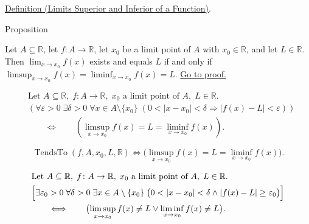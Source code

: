 \begin{dependencies}
\hyperref[def:limsup-liminf-function]{Definition (Limits Superior and Inferior of a Function)}.
\end{dependencies}

\begin{propositionbox}{Proposition}
\begin{proposition}[Limit Exists iff $\limsup=\liminf$]
\label{prop:limsup-liminf-limit-criterion}
Let $A \subseteq \mathbb{R}$, let $f \colon A \to \mathbb{R}$, let $x_0$ be a limit point of $A$ with $x_0 \in \mathbb{R}$, and let $L \in \mathbb{R}$. Then $\lim_{x \to x_0} f(x)$ exists and equals $L$ if and only if $\limsup_{x \to x_0} f(x) = \liminf_{x \to x_0} f(x) = L$.
\hyperref[prf:limsup-liminf-limit-criterion]{Go to proof.}
\end{proposition}
\end{propositionbox}

\begin{remark*}
\[
\begin{aligned}
&\text{Let } A \subseteq \mathbb{R},\; f \colon A \to \mathbb{R},\; x_0 \text{ a limit point of } A,\; L \in \mathbb{R}.\\
&\left(\forall \varepsilon > 0\; \exists \delta > 0\; \forall x \in A \setminus \{x_0\}\;
  (0 < |x - x_0| < \delta \Rightarrow |f(x) - L| < \varepsilon)\right)\\
&\qquad\Longleftrightarrow\qquad
\left(\limsup_{x \to x_0} f(x) = L = \liminf_{x \to x_0} f(x)\right).
\end{aligned}
\]
\end{remark*}

\begin{remark*}
\[
\operatorname{TendsTo}(f,A,x_0,L,\mathbb{R})
\Longleftrightarrow
\bigl(\limsup_{x \to x_0} f(x) = L = \liminf_{x \to x_0} f(x)\bigr).
\]
\end{remark*}

\begin{remark*}
\[
\begin{aligned}
&\text{Let } A \subseteq \mathbb{R},\; f \colon A \to \mathbb{R},\; x_0 \text{ a limit point of } A,\; L \in \mathbb{R}.\\
&\Bigl[\exists \varepsilon_0>0\;\forall \delta>0\;\exists x\in A\setminus\{x_0\}\;
\bigl(0<|x-x_0|<\delta\land |f(x)-L|\ge\varepsilon_0\bigr)\Bigr]\\
&\qquad\Longleftrightarrow\qquad
\bigl(\limsup_{x\to x_0} f(x)\ne L \lor \liminf_{x\to x_0} f(x)\ne L\bigr).
\end{aligned}
\]
\end{remark*}

